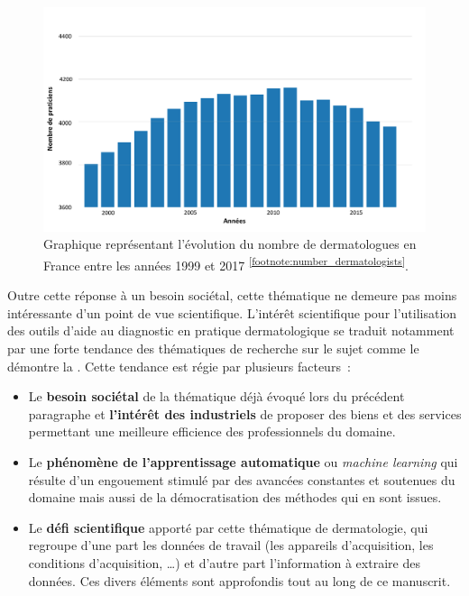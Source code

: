 \begin{figure}[H]
    \centering
    \includegraphics[width=\linewidth]{contents/i_introduction/resources/evolution_dermatologists.pdf}
    \caption{Graphique représentant l'évolution du nombre de dermatologues en France entre les années 1999 et 2017 \textsuperscript{\ref{footnote:number_dermatologists}}.}
    \label{fig:number_dermatologists}
\end{figure}\par
\addtocounter{footnote}{1}

Outre cette réponse à un besoin sociétal, cette thématique ne demeure pas moins intéressante d’un point de vue scientifique. L’intérêt scientifique pour l'utilisation des outils d'aide au diagnostic en pratique dermatologique se traduit notamment par une forte tendance des thématiques de recherche sur le sujet comme le démontre la . Cette tendance est régie par plusieurs facteurs~:
\begin{itemize}
    \item Le \textbf{besoin sociétal} de la thématique déjà évoqué lors du précédent paragraphe et \textbf{l'intérêt des industriels} de proposer des biens et des services permettant une meilleure efficience des professionnels du domaine.
    \item Le \textbf{phénomène de l'apprentissage automatique} ou \textit{machine learning} qui résulte d'un engouement stimulé par des avancées constantes et soutenues du domaine mais aussi de la démocratisation des méthodes qui en sont issues. 
    \item Le \textbf{défi scientifique} apporté par cette thématique de dermatologie, qui regroupe d'une part les données de travail (les appareils d'acquisition, les conditions d'acquisition, \ldots) et d'autre part l'information à extraire des données. Ces divers éléments sont approfondis tout au long de ce manuscrit.
\end{itemize}\par
\clearpage

